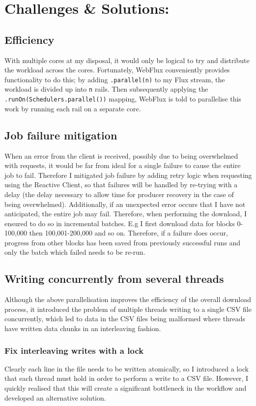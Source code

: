 \section{Challenges \& Solutions:}
\subsection{Efficiency}
With multiple cores at my disposal, it would only be logical to try and distribute the workload across the cores. Fortunately, WebFlux conveniently provides functionality to do this; by adding \texttt{.parallel(n)} to my Flux stream, the workload is divided up into \texttt{n} rails. Then subsequently applying the \texttt{.runOn(Schedulers.parallel())} mapping, WebFlux is told to parallelise this work by running each rail on a separate core. 
\subsection{Job failure mitigation}
When an error from the client is received, possibly due to being overwhelmed with requests, it would be far from ideal for a single failure to cause the entire job to fail. Therefore I mitigated job failure by adding retry logic when requesting using the Reactive Client, so that failures will be handled by re-trying with a delay (the delay necessary to allow time for producer recovery in the case of being overwhelmed). Additionally, if an unexpected error occurs that I have not anticipated, the entire job may fail. Therefore, when performing the download, I ensured to do so in incremental batches. E.g I first download data for blocks 0-100,000 then 100,001-200,000 and so on. Therefore, if a failure does occur, progress from other blocks has been saved from previously successful runs and only the batch which failed needs to be re-run. 

\subsection{Writing concurrently from several threads}
Although the above parallelisation improves the efficiency of the overall download process, it introduced the problem of multiple threads writing to a single CSV file concurrently, which led to data in the CSV files being malformed where threads have written data chunks in an interleaving fashion. 

\subsubsection{Fix interleaving writes with a lock} 
Clearly each line in the file needs to be written atomically, so I introduced a lock that each thread must hold in order to perform a write to a CSV file. However, I quickly realised that this will create a significant bottleneck in the workflow and developed an alternative solution.

